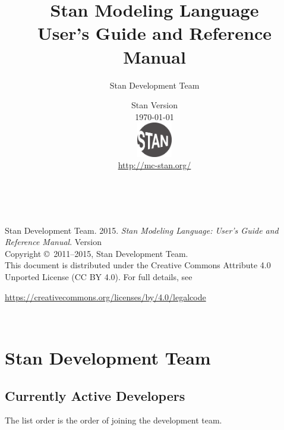 \title{\Huge\bf Stan Modeling Language \\[4pt] {\LARGE User's Guide
    and Reference Manual}}
\author{Stan Development Team}

\date{\vspace*{36pt} Stan Version \stanversion
\\[8pt] {\small \today}
\\[36pt]
{
\vfill
\includegraphics[width=0.6in]{img/stanlogo-main.pdf}}
\\
\vspace*{6pt}
{\small \url{http://mc-stan.org/}}
}
\maketitle

\newpage
\thispagestyle{empty}
\mbox{ }
\vfill
\begin{center}
\begin{minipage}[t]{0.75\textwidth}
\small
Stan Development Team. 2015.  
{\it Stan Modeling Language: User's Guide and Reference Manual}. Version
\stanversion
\vspace*{20pt}
\mbox{ }
\\
Copyright \copyright \ 2011--2015, Stan Development Team.
\vspace*{28pt}
\mbox{} \\
This document is distributed under the Creative Commons Attribute 4.0
Unported License (CC BY 4.0).  For full details, see
\begin{center}
\url{https://creativecommons.org/licenses/by/4.0/legalcode} 
\end{center}
\end{minipage}
\vspace*{24pt}
\mbox{ }
\end{center}

\newpage
\section*{Stan Development Team}

\subsection*{Currently Active Developers}

The list order is the order of joining the development team.

